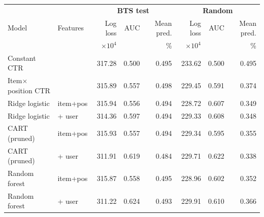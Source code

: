 \begin{tabular}{@{}llrrr@{\hspace{.6cm}}rrr@{}}\toprule
 & & \multicolumn{3}{c}{\color{bts}\textbf{BTS test}} & \multicolumn{3}{c}{\color{rnd}\textbf{Random}}\\
Model & Features & Log loss & AUC & Mean pred. & Log loss & AUC & Mean pred.\\
 & & \(\times10^{4}\) & & \% & \(\times10^{4}\) & & \%\\\midrule
Constant CTR &  & 317.28 & 0.500 & 0.495 & 233.62 & 0.500 & 0.495 \\
Item\(\times\)position CTR &  & 315.89 & 0.557 & 0.498 & 229.45 & 0.591 & 0.374 \\
Ridge logistic & item+pos & 315.94 & 0.556 & 0.494 & 228.72 & 0.607 & 0.349 \\
Ridge logistic & + user & 314.36 & 0.597 & 0.494 & 229.33 & 0.608 & 0.348 \\
CART (pruned) & item+pos & 315.93 & 0.557 & 0.494 & 229.34 & 0.595 & 0.355 \\
CART (pruned) & + user & 311.91 & 0.619 & 0.484 & 229.71 & 0.622 & 0.338 \\
Random forest & item+pos & 315.87 & 0.558 & 0.495 & 228.96 & 0.602 & 0.352 \\
Random forest & + user & 311.22 & 0.624 & 0.493 & 229.91 & 0.610 & 0.366 \\
\bottomrule\end{tabular}